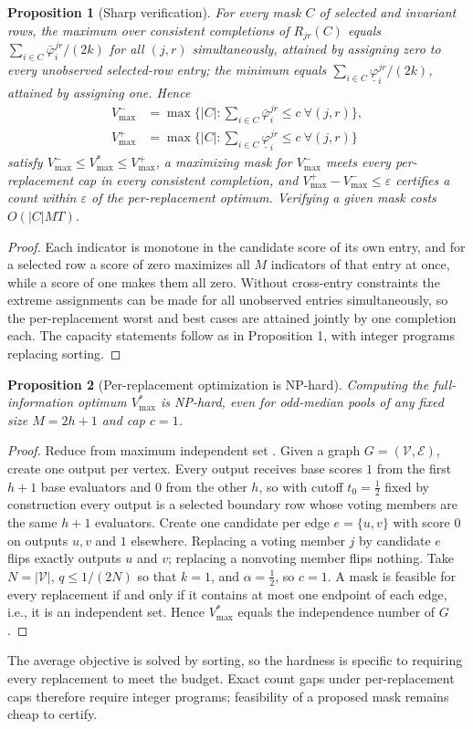 \documentclass[11pt]{article}
\newtheorem{proposition}{Proposition}
\begin{document}
\begin{proposition}[Sharp verification]
\label{prop:capverify}
For every mask $C$ of selected and invariant rows, the maximum over consistent completions of $R_{jr}(C)$ equals $\sum_{i\in C}\bar\varphi_i^{jr}/(2k)$ for all $(j,r)$ simultaneously, attained by assigning zero to every unobserved selected-row entry; the minimum equals $\sum_{i\in C}\underline\varphi_i^{jr}/(2k)$, attained by assigning one. Hence
\begin{align*}
V^-_{\max}&=\max\Big\{|C|:\textstyle\sum_{i\in C}\bar\varphi_i^{jr}\le c\ \forall (j,r)\Big\},\\
V^+_{\max}&=\max\Big\{|C|:\textstyle\sum_{i\in C}\underline\varphi_i^{jr}\le c\ \forall (j,r)\Big\}
\end{align*}
satisfy $V^-_{\max}\le V^*_{\max}\le V^+_{\max}$, a maximizing mask for $V^-_{\max}$ meets every per-replacement cap in every consistent completion, and $V^+_{\max}-V^-_{\max}\le\varepsilon$ certifies a count within $\varepsilon$ of the per-replacement optimum. Verifying a given mask costs $O(|C|MT)$.
\end{proposition}
\begin{proof}
Each indicator is monotone in the candidate score of its own entry, and for a selected row a score of zero maximizes all $M$ indicators of that entry at once, while a score of one makes them all zero. Without cross-entry constraints the extreme assignments can be made for all unobserved entries simultaneously, so the per-replacement worst and best cases are attained jointly by one completion each. The capacity statements follow as in Proposition 1, with integer programs replacing sorting.
\end{proof}

\begin{proposition}[Per-replacement optimization is NP-hard]
\label{prop:nphard}
Computing the full-information optimum $V^*_{\max}$ is NP-hard, even for odd-median pools of any fixed size $M=2h+1$ and cap $c=1$.
\end{proposition}
\begin{proof}
Reduce from maximum independent set \citep{garey1979computers}. Given a graph $G=(\mathcal V,\mathcal E)$, create one output per vertex. Every output receives base scores $1$ from the first $h+1$ base evaluators and $0$ from the other $h$, so with cutoff $t_0=\frac12$ fixed by construction every output is a selected boundary row whose voting members are the same $h+1$ evaluators. Create one candidate per edge $e=\{u,v\}$ with score $0$ on outputs $u,v$ and $1$ elsewhere. Replacing a voting member $j$ by candidate $e$ flips exactly outputs $u$ and $v$; replacing a nonvoting member flips nothing. Take $N=|\mathcal V|$, $q\le1/(2N)$ so that $k=1$, and $\alpha=\frac12$, so $c=1$. A mask is feasible for every replacement if and only if it contains at most one endpoint of each edge, i.e., it is an independent set. Hence $V^*_{\max}$ equals the independence number of $G$.
\end{proof}
The average objective is solved by sorting, so the hardness is specific to requiring every replacement to meet the budget. Exact count gaps under per-replacement caps therefore require integer programs; feasibility of a proposed mask remains cheap to certify.
\end{document}
